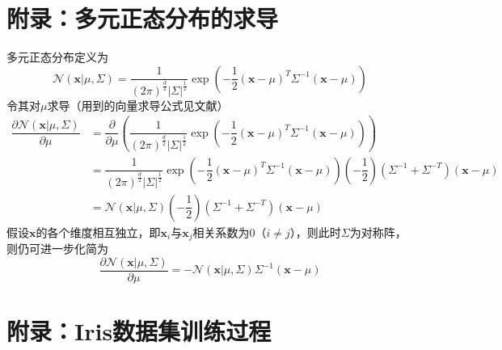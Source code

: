 \appendix

\section{附录：多元正态分布的求导}

多元正态分布定义为
\begin{equation}
    \mathcal{N}\left(\mathbf{x}|\mu,\Sigma\right)=
    \dfrac{1}{\left(2\pi\right)^{\frac{d}{2}}|\Sigma|^{\frac{1}{2}}}\exp\left(-\dfrac{1}{2}\left(\mathbf{x}-\mu\right)^T\Sigma^{-1}\left(\mathbf{x}-\mu\right)\right)
\end{equation}
令其对$\mu$求导（用到的向量求导公式见文献\cite{cookbook}）
\begin{align}
    \dfrac{\partial\mathcal{N}\left(\mathbf{x}|\mu,\Sigma\right)}{\partial\mu}
    &= \dfrac{\partial}{\partial\mu}\left(\dfrac{1}{\left(2\pi\right)^{\frac{d}{2}}|\Sigma|^{\frac{1}{2}}}\exp\left(-\dfrac{1}{2}\left(\mathbf{x}-\mu\right)^T\Sigma^{-1}\left(\mathbf{x}-\mu\right)\right)\right) \\
    &= \dfrac{1}{\left(2\pi\right)^{\frac{d}{2}}|\Sigma|^{\frac{1}{2}}}\exp\left(-\dfrac{1}{2}\left(\mathbf{x}-\mu\right)^T\Sigma^{-1}\left(\mathbf{x}-\mu\right)\right)\left(-\dfrac{1}{2}\right)\left(\Sigma^{-1}+\Sigma^{-T}\right)\left(\mathbf{x}-\mu\right) \\
    &= \mathcal{N}\left(\mathbf{x}|\mu,\Sigma\right)\left(-\dfrac{1}{2}\right)\left(\Sigma^{-1}+\Sigma^{-T}\right)\left(\mathbf{x}-\mu\right)
\end{align}
假设$\mathbf{x}$的各个维度相互独立，即$\mathbf{x}_i$与$\mathbf{x}_j$相关系数为$0$（$i\neq j$），则此时$\Sigma$为对称阵，则仍可进一步化简为
\begin{equation}
    \dfrac{\partial\mathcal{N}\left(\mathbf{x}|\mu,\Sigma\right)}{\partial\mu}
    =-\mathcal{N}\left(\mathbf{x}|\mu,\Sigma\right)\Sigma^{-1}\left(\mathbf{x}-\mu\right)
\end{equation}

\section{附录：Iris数据集训练过程}

